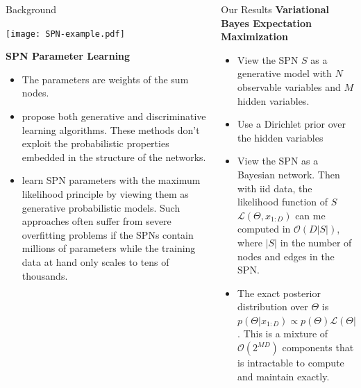 \documentclass[final]{beamer}
\newlength{\onecolwid}
\newcommand{\cmuRed}[1]{\textcolor{CMURed}{#1}}
\newcommand{\cmuRedB}[1]{\textcolor{CMURed}{\textbf{#1}}}
\newcommand{\abs}[1]{\lvert#1\rvert}
\begin{document}
\begin{frame}[t]
\begin{columns}[t]
\begin{column}{\onecolwid}
\begin{block}{Background}
        \begin{center}
          \texttt{[image: SPN-example.pdf]}
        \end{center}

        \cmuRedB{SPN Parameter Learning}
        \begin{itemize}
        \item The \cmuRed{parameters} are weights of the sum nodes.
        \item \cite{poon2011sum,gens2012discriminative} propose both
          \cmuRed{generative and discriminative} learning algorithms.
          These methods don't exploit the probabilistic properties embedded in the
          structure of the networks.
        \item \cite{peharz2015foundations} learn SPN parameters with
          the maximum likelihood principle by viewing them as
          \cmuRed{generative probabilistic models.}
          Such approaches often suffer from
          severe overfitting problems if the SPNs contain millions of parameters
          while the training data at hand only scales to tens of thousands.
        \end{itemize}

      \end{block}


    \end{column} %

    \hspace{-12cm}

    \begin{column}{\onecolwid}
      \begin{block}{Our Results}
        \cmuRedB{Variational Bayes Expectation Maximization}
        \begin{itemize}
        \item View the SPN $S$ as a \cmuRed{generative model} with $N$
          observable
          variables and $M$ hidden variables.
        \item Use a \cmuRed{Dirichlet prior} over the hidden variables
        \item View the SPN as a Bayesian network. Then with iid data,
          the likelihood function of $S$
          $\mathcal{L}(\Theta, x_{1:D})$ can me computed in
          $\mathcal{O}(D\abs{S})$, where $\abs{S}$ in the number of
          nodes and edges in the SPN.
        \item The exact posterior distribution over $\Theta$ is
          $p(\Theta|x_{1:D}) \propto p(\Theta)\mathcal{L}(\Theta|x_{1:D})$.
          This is a mixture of $\mathcal{O}(2^{MD})$ components
          that is intractable to compute and maintain exactly.
        \end{itemize}


\end{block}
\end{column}
\end{columns}
\end{frame}
\end{document}
